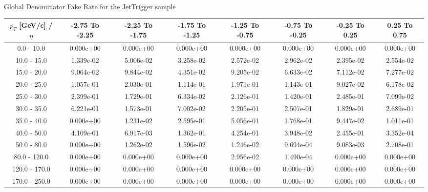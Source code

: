 \large 
Global Denominator Fake Rate for the JetTrigger sample
\footnotesize 
\begin{tabular*}{\textwidth}{|c|c|c|c|c|c|c|c|}\hline 
$p_T$ [GeV/c] / $\eta$  & -2.75 To -2.25 & -2.25 To -1.75 & -1.75 To -1.25 & -1.25 To -0.75 & -0.75 To -0.25 & -0.25 To 0.25 & 0.25 To 0.75 \\ 
 \hline 
0.0 - 10.0 & 0.000e+00 & 0.000e+00 & 0.000e+00 & 0.000e+00 & 0.000e+00 & 0.000e+00 & 0.000e+00 \\ 
10.0 - 15.0 & 1.339e-02 & 5.006e-02 & 3.258e-02 & 2.572e-02 & 2.962e-02 & 2.395e-02 & 2.554e-02 \\ 
15.0 - 20.0 & 9.064e-02 & 9.844e-02 & 4.351e-02 & 9.205e-02 & 6.633e-02 & 7.112e-02 & 7.277e-02 \\ 
20.0 - 25.0 & 1.057e-01 & 2.030e-01 & 1.114e-01 & 1.971e-01 & 1.143e-01 & 9.027e-02 & 6.178e-02 \\ 
25.0 - 30.0 & 2.399e-01 & 1.729e-01 & 6.334e-02 & 2.126e-01 & 1.420e-01 & 2.485e-01 & 7.099e-02 \\ 
30.0 - 35.0 & 6.221e-01 & 1.573e-01 & 7.002e-02 & 2.205e-01 & 2.507e-01 & 1.829e-01 & 2.689e-01 \\ 
35.0 - 40.0 & 0.000e+00 & 1.231e-02 & 2.595e-01 & 5.056e-01 & 1.768e-01 & 9.447e-02 & 1.011e-01 \\ 
40.0 - 50.0 & 4.109e-01 & 6.917e-03 & 1.362e-01 & 4.254e-01 & 3.948e-02 & 2.455e-01 & 3.352e-04 \\ 
50.0 - 80.0 & 0.000e+00 & 1.262e-02 & 1.596e-02 & 1.246e-02 & 9.694e-04 & 9.083e-03 & 2.708e-01 \\ 
80.0 - 120.0 & 0.000e+00 & 0.000e+00 & 0.000e+00 & 2.956e-02 & 1.490e-04 & 0.000e+00 & 0.000e+00 \\ 
120.0 - 170.0 & 0.000e+00 & 0.000e+00 & 0.000e+00 & 0.000e+00 & 0.000e+00 & 0.000e+00 & 0.000e+00 \\ 
170.0 - 250.0 & 0.000e+00 & 0.000e+00 & 0.000e+00 & 0.000e+00 & 0.000e+00 & 0.000e+00 & 0.000e+00 \\ 
 \hline 
\end{tabular*} 

